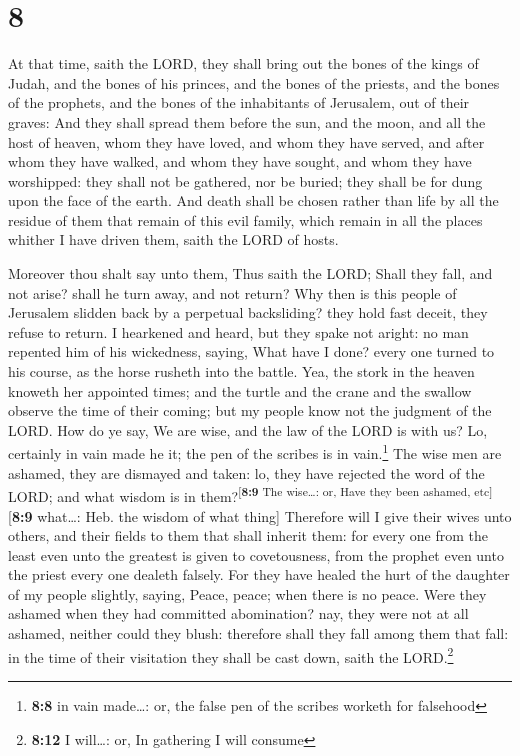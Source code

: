 \hypertarget{section-7}{%
\section{8}\label{section-7}}

 At that time, saith the LORD, they shall bring out the
bones of the kings of Judah, and the bones of his princes, and the bones
of the priests, and the bones of the prophets, and the bones of the
inhabitants of Jerusalem, out of their graves:  And they
shall spread them before the sun, and the moon, and all the host of
heaven, whom they have loved, and whom they have served, and after whom
they have walked, and whom they have sought, and whom they have
worshipped: they shall not be gathered, nor be buried; they shall be for
dung upon the face of the earth.  And death shall be
chosen rather than life by all the residue of them that remain of this
evil family, which remain in all the places whither I have driven them,
saith the LORD of hosts.

 Moreover thou shalt say unto them, Thus saith the LORD;
Shall they fall, and not arise? shall he turn away, and not return?
 Why then is this people of Jerusalem slidden back by a
perpetual backsliding? they hold fast deceit, they refuse to return.
 I hearkened and heard, but they spake not aright: no man
repented him of his wickedness, saying, What have I done? every one
turned to his course, as the horse rusheth into the battle.
 Yea, the stork in the heaven knoweth her appointed times;
and the turtle and the crane and the swallow observe the time of their
coming; but my people know not the judgment of the LORD. 
How do ye say, We are wise, and the law of the LORD is with us? Lo,
certainly in vain made he it; the pen of the scribes is in
vain.\footnote{\textbf{8:8} in vain made\ldots: or, the false pen of the
  scribes worketh for falsehood}  The wise men are
ashamed, they are dismayed and taken: lo, they have rejected the word of
the LORD; and what wisdom is in them?\textsuperscript{{[}\textbf{8:9}
The wise\ldots: or, Have they been ashamed, etc{]}}{[}\textbf{8:9}
what\ldots: Heb. the wisdom of what thing{]}  Therefore
will I give their wives unto others, and their fields to them that shall
inherit them: for every one from the least even unto the greatest is
given to covetousness, from the prophet even unto the priest every one
dealeth falsely.  For they have healed the hurt of the
daughter of my people slightly, saying, Peace, peace; when there is no
peace.  Were they ashamed when they had committed
abomination? nay, they were not at all ashamed, neither could they
blush: therefore shall they fall among them that fall: in the time of
their visitation they shall be cast down, saith the LORD.\footnote{\textbf{8:12}
  I will\ldots: or, In gathering I will consume}


